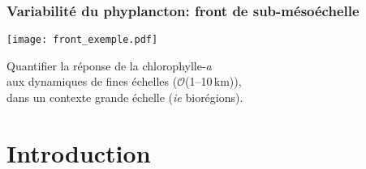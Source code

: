 \documentclass[11pt, french, aspectratio=32]{beamer}
\begin{document}

\begin{frame}
  \frametitle{Variabilité du phyplancton: front de sub-mésoéchelle}

  \texttt{[image: front\_exemple.pdf]}
  \\

\end{frame}


\begin{frame}


  \vspace{3em}

  {
    \centering
    \begin{onehalfspacing}
      Quantifier la réponse de la chlorophylle-\textit{a}
      \\aux dynamiques de fines échelles (\(\mathcal{O}\)(1--10\,km)),
      \\dans un contexte grande échelle (\textit{ie} biorégions).
      \\
    \end{onehalfspacing}
  }
\end{frame}


\section*{Introduction}

\end{document}
